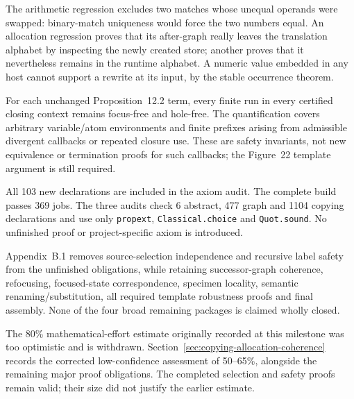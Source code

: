 The arithmetic regression excludes two matches whose unequal operands were
swapped: binary-match uniqueness would force the two numbers equal. An
allocation regression proves that its after-graph really leaves the
translation alphabet by inspecting the newly created store; another proves
that it nevertheless remains in the runtime alphabet. A numeric value
embedded in any host cannot support a rewrite at its input, by the stable
occurrence theorem.





For each unchanged Proposition~12.2 term, every finite run in every certified
closing context remains focus-free and hole-free. The quantification covers
arbitrary variable/atom environments and finite prefixes arising from
admissible divergent callbacks or repeated closure use. These are safety
invariants, not new equivalence or termination proofs for such callbacks;
the Figure~22 template argument is still required.



All 103 new declarations are included in the axiom audit. The complete
build passes 369 jobs. The three audits check 6 abstract, 477 graph and 1104
copying declarations and use only \texttt{propext}, \texttt{Classical.choice}
and \texttt{Quot.sound}. No unfinished proof or project-specific axiom is
introduced.

Appendix~B.1 removes source-selection independence and recursive label safety
from the unfinished obligations, while retaining successor-graph coherence,
refocusing, focused-state correspondence, specimen locality, semantic
renaming/substitution, all required template robustness proofs and final
assembly. None of the four broad remaining packages is claimed wholly closed.

The 80\% mathematical-effort estimate originally recorded at this milestone
was too optimistic and is withdrawn. Section~\ref{sec:copying-allocation-coherence}
records the corrected low-confidence assessment of 50--65\%, alongside the
remaining major proof obligations. The completed selection and safety proofs
remain valid; their size did not justify the earlier estimate.

